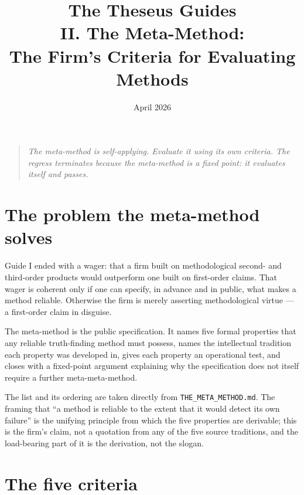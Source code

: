 \documentclass[11pt,letterpaper]{article}
\title{\textbf{The Theseus Guides}\\[6pt]\large II. The Meta-Method:\\The Firm's Criteria for Evaluating Methods}
\date{April 2026}
\author{}
\newcommand{\file}[1]{\texttt{#1}}
\begin{document}
\maketitle
\thispagestyle{empty}

\begin{quote}\itshape
The meta-method is self-applying. Evaluate it using its own criteria. The regress terminates because the meta-method is a fixed point: it evaluates itself and passes.
\end{quote}

\vspace{1em}
\tableofcontents
\newpage

\section{The problem the meta-method solves}

Guide I ended with a wager: that a firm built on methodological second- and third-order products would outperform one built on first-order claims. That wager is coherent only if one can specify, in advance and in public, what makes a method reliable. Otherwise the firm is merely asserting methodological virtue --- a first-order claim in disguise.

The meta-method is the public specification. It names five formal properties that any reliable truth-finding method must possess, names the intellectual tradition each property was developed in, gives each property an operational test, and closes with a fixed-point argument explaining why the specification does not itself require a further meta-meta-method.

The list and its ordering are taken directly from \file{THE\_META\_METHOD.md}. The framing that ``a method is reliable to the extent that it would detect its own failure'' is the unifying principle from which the five properties are derivable; this is the firm's claim, not a quotation from any of the five source traditions, and the load-bearing part of it is the derivation, not the slogan.

\section{The five criteria}
\end{document}
